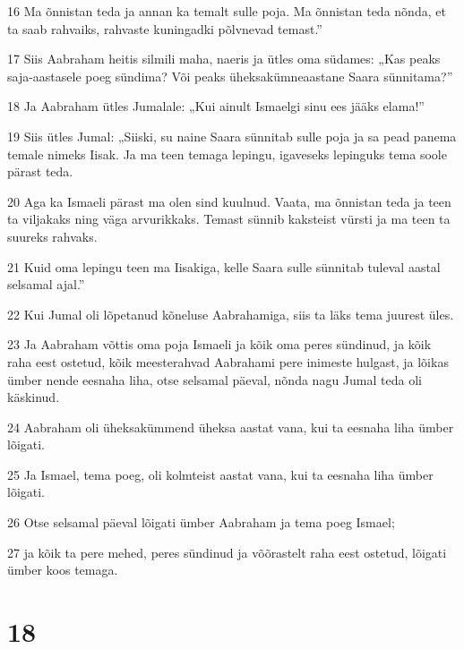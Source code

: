 \par 16 Ma õnnistan teda ja annan ka temalt sulle poja. Ma õnnistan teda nõnda, et ta saab rahvaiks, rahvaste kuningadki põlvnevad temast.”
\par 17 Siis Aabraham heitis silmili maha, naeris ja ütles oma südames: „Kas peaks saja-aastasele poeg sündima? Või peaks üheksakümneaastane Saara sünnitama?”
\par 18 Ja Aabraham ütles Jumalale: „Kui ainult Ismaelgi sinu ees jääks elama!”
\par 19 Siis ütles Jumal: „Siiski, su naine Saara sünnitab sulle poja ja sa pead panema temale nimeks Iisak. Ja ma teen temaga lepingu, igaveseks lepinguks tema soole pärast teda.
\par 20 Aga ka Ismaeli pärast ma olen sind kuulnud. Vaata, ma õnnistan teda ja teen ta viljakaks ning väga arvurikkaks. Temast sünnib kaksteist vürsti ja ma teen ta suureks rahvaks.
\par 21 Kuid oma lepingu teen ma Iisakiga, kelle Saara sulle sünnitab tuleval aastal selsamal ajal.”
\par 22 Kui Jumal oli lõpetanud kõneluse Aabrahamiga, siis ta läks tema juurest üles.
\par 23 Ja Aabraham võttis oma poja Ismaeli ja kõik oma peres sündinud, ja kõik raha eest ostetud, kõik meesterahvad Aabrahami pere inimeste hulgast, ja lõikas ümber nende eesnaha liha, otse selsamal päeval, nõnda nagu Jumal teda oli käskinud.
\par 24 Aabraham oli üheksakümmend üheksa aastat vana, kui ta eesnaha liha ümber lõigati.
\par 25 Ja Ismael, tema poeg, oli kolmteist aastat vana, kui ta eesnaha liha ümber lõigati.
\par 26 Otse selsamal päeval lõigati ümber Aabraham ja tema poeg Ismael;
\par 27 ja kõik ta pere mehed, peres sündinud ja võõrastelt raha eest ostetud, lõigati ümber koos temaga.

\chapter{18}


